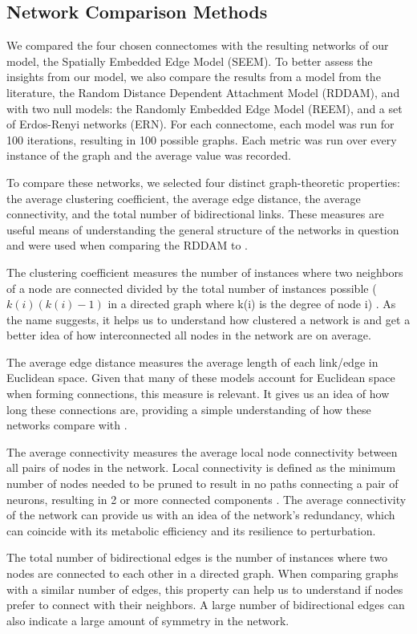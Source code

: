 \subsection{Network Comparison Methods}
We compared the four chosen \ce connectomes with the resulting networks of our model, the Spatially Embedded Edge Model (SEEM). 
To better assess the insights from our model, we also compare the results from a model from the literature, the Random Distance Dependent Attachment Model (RDDAM), and with two null models: the Randomly Embedded Edge Model (REEM), and a set of Erdos-Renyi networks (ERN).
For each connectome, each model was run for 100 iterations, resulting in 100 possible graphs. 
Each metric was run over every instance of the graph and the average value was recorded. 

To compare these networks, we selected four distinct graph-theoretic properties: the average clustering coefficient, the average edge distance, the average connectivity, and the total number of bidirectional links. 
These measures are useful means of understanding the general structure of the networks in question and were used when comparing the RDDAM to \ce \citep{Itzhack}.

The clustering coefficient measures the number of instances where two neighbors of a node are connected divided by the total number of instances possible ($k(i)(k(i)-1)$ in a directed graph where k(i) is the degree of node i) \citep{Watts}. 
As the name suggests, it helps us to understand how clustered a network is and get a better idea of how interconnected all nodes in the network are on average. 

The average edge distance measures the average length of each link/edge in Euclidean space. 
Given that many of these models account for Euclidean space when forming connections, this measure is relevant. 
It gives us an idea of how long these connections are, providing a simple understanding of how these networks compare with \ce. 

The average connectivity measures the average local node connectivity between all pairs of nodes in the network.
Local connectivity is defined as the minimum number of nodes needed to be pruned to result in no paths connecting a pair of neurons, resulting in 2 or more connected components \citep{Esfahanian}.
The average connectivity of the network can provide us with an idea of the network's redundancy, which can coincide with its
metabolic efficiency and its resilience to perturbation.

The total number of bidirectional edges is the number of instances where two nodes are connected to each other in a directed graph.
When comparing graphs with a similar number of edges, this property can help us to understand if nodes prefer to connect with their neighbors.
A large number of bidirectional edges can also indicate a large amount of symmetry in the network.

